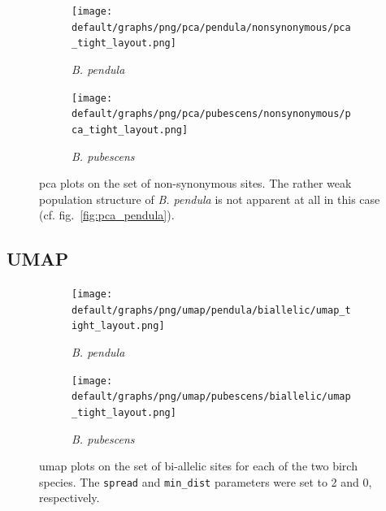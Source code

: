 \documentclass[hidelinks,11pt]{article}
\newcommand{\pendula}{\textit{B. pendula}}
\newcommand{\pubescens}{\textit{B. pubescens}}
\begin{document}
    \begin{figure}[H]
        \centering
        \begin{subfigure}[b]{0.493\textwidth}
            \centering
            \texttt{[image: default/graphs/png/pca/pendula/nonsynonymous/pca\_tight\_layout.png]}
            \caption{\pendula{}}
            \label{fig:pca_nonsynonymous_pendula}
        \end{subfigure}
        \hfill
        \begin{subfigure}[b]{0.49\textwidth}
            \centering
            \texttt{[image: default/graphs/png/pca/pubescens/nonsynonymous/pca\_tight\_layout.png]}
            \caption{\pubescens{}}
            \label{fig:pca_nonsynonymous_pubescens}
        \end{subfigure}
        \caption{\acrshort{pca} plots on the set of non-synonymous sites. The rather weak population structure of \pendula{} is not apparent at all in this case (cf. fig.~\ref{fig:pca_pendula}).}
        \label{fig:pca_pendula_pubescens_separate_nonsynonymous}
    \end{figure}

    \clearpage

    \subsection{UMAP}
    \label{sec:appendix-umap}

    \begin{figure}[H]
        \centering
        \begin{subfigure}[b]{0.487\textwidth}
            \centering
            \texttt{[image: default/graphs/png/umap/pendula/biallelic/umap\_tight\_layout.png]}
            \caption{\pendula{}}
            \label{fig:umap_biallelic_pendula}
        \end{subfigure}
        \hfill
        \begin{subfigure}[b]{0.5\textwidth}
            \centering
            \texttt{[image: default/graphs/png/umap/pubescens/biallelic/umap\_tight\_layout.png]}
            \caption{\pubescens{}}
            \label{fig:umap_biallelic_pubescens}
        \end{subfigure}
        \caption{\acrshort{umap} plots on the set of bi-allelic sites for each of the two birch species. The \texttt{spread} and \texttt{min\_dist} parameters were set to 2 and 0, respectively.}
        \label{fig:umap_biallelic_pendula_pubescens_separate}
    \end{figure}
\end{document}
